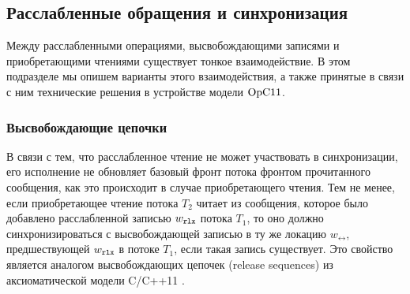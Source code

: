 \subsection{Расслабленные обращения и синхронизация}
Между расслабленными операциями, высвобождающими записями и
приобретающими чтениями существует тонкое взаимодействие.
В этом подразделе мы опишем варианты этого взаимодействия, а также
принятые в связи с ним технические решения в устройстве модели $\mathrm{OpC11}$.

\subsubsection{Высвобождающие цепочки}
В связи с тем, что расслабленное чтение не может участвовать в синхронизации,
его исполнение не обновляет базовый фронт потока фронтом прочитанного сообщения,
как это происходит в случае приобретающего чтения.
Тем не менее, если приобретающее чтение потока $T_2$ читает из сообщения, которое
было добавлено расслабленной записью $w_{\mathtt{rlx}}$ потока $T_1$, то оно должно синхронизироваться
с высвобождающей записью в ту же локацию $w_{\rel}$, предшествующей $w_{\mathtt{rlx}}$ в потоке $T_1$,
если такая запись существует.
Это свойство является аналогом высвобождающих цепочек (release sequences) из аксиоматической
модели C/C++11 \cite{Batty-al:POPL11}.

